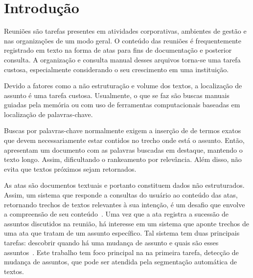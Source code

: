 

\section{Introdução}
	\label{sec:introducao}

Reuniões são tarefas presentes em atividades corporativas, ambientes de gestão e nas organizações de um modo geral. O conteúdo das reuniões é frequentemente registrado em texto na forma de atas para fins de documentação e posterior consulta. A organização e consulta manual desses arquivos torna-se uma tarefa custosa, especialmente considerando o seu crescimento em uma instituição. 

%
Devido a fatores como a não estruturação e volume dos textos, a localização de assunto é uma tarefa custosa. 
%
Usualmente, o que se faz são buscas manuais guiadas pela memória ou com uso de ferramentas computacionais baseadas em localização de palavras-chave.

%
Buscas por palavras-chave normalmente exigem a inserção de de termos exatos que devem necessariamente estar contidos no trecho onde está o assunto.
%
Então, apresentam um documento com as palavras buscadas em destaque, mantendo o texto longo. 
%
Assim, dificultando o rankeamento por relevância. 
%
Além disso, não evita que textos próximos sejam retornados.

As atas são documentos textuais e portanto constituem dados não estruturados. Assim, um sistema que responde a consultas do usuário ao conteúdo das atas, retornando trechos de textos relevantes à sua intenção, é um desafio que envolve a compreensão de seu conteúdo~\cite{Bokaei2015}. 
Uma vez que a ata registra a sucessão de assuntos discutidos na reunião, há interesse em um sistema que aponte trechos de uma ata que tratam de um assunto específico. Tal sistema tem duas principais tarefas: descobrir quando há uma mudança de assunto e quais são esses assuntos~\cite{Banerjee2006}. Este trabalho tem foco principal na na primeira tarefa, detecção de mudança de assuntos, que pode ser atendida pela segmentação automática de textos.



